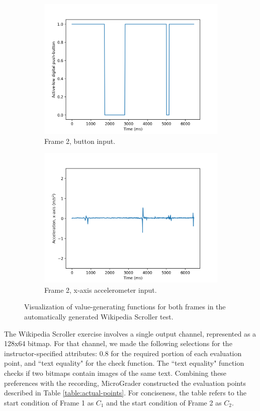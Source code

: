 \documentclass[12pt]{article}
\begin{document}
\begin{figure}[ht]
\begin{subfigure}[b]{.45\linewidth}
\includegraphics[width=\linewidth]{f1-button.png}
\caption{Frame 2, button input.}
\end{subfigure}
\begin{subfigure}[b]{.45\linewidth}
\includegraphics[width=\linewidth]{f1-acc.png}
\caption{Frame 2, x-axis accelerometer input.}
\end{subfigure}

\caption{Visualization of value-generating functions for both frames in the automatically generated Wikipedia Scroller test.}
\label{fig:actual-input-frames}
\end{figure}

The Wikipedia Scroller exercise involves a single output channel, represented as a 128x64 bitmap.  For that channel, we made the following selections for the instructor-specified attributes: 0.8 for the required portion of each evaluation point, and ``text equality" for the check function.  The ``text equality" function checks if two bitmaps contain images of the same text.   Combining these preferences with the recording, MicroGrader constructed the evaluation points described in Table \ref{table:actual-points}.  For conciseness, the table refers to the start condition of Frame 1 as $C_1$ and the start condition of Frame 2 as $C_2$.
\end{document}
